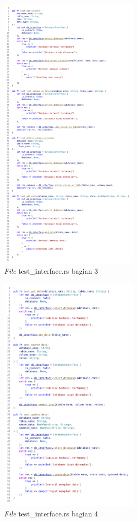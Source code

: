 \begin{figure}[H]
  \centering{}
	\includegraphics[width=0.6\textwidth]{gambar/lampiran/file-test-database-interface-3.png}
  \caption{\emph{File} test\_interface.rs bagian 3}
\end{figure}

\begin{figure}[H]
  \centering{}
	\includegraphics[width=0.6\textwidth]{gambar/lampiran/file-test-database-interface-4.png}
  \caption{\emph{File} test\_interface.rs bagian 4}
\end{figure}

